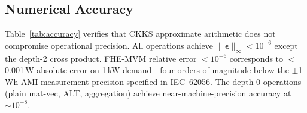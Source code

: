 \documentclass[conference]{IEEEtran}
\begin{document}
\begin{table}[!t]
\centering
\caption{Runtime Performance ($N{=}16384$, $\Delta{=}2^{40}$)}
\label{tab:performance}
\footnotesize
{}
\end{table}

\subsection{Numerical Accuracy}

Table~\ref{tab:accuracy} verifies that CKKS approximate arithmetic does not compromise operational precision. All operations achieve $\|\boldsymbol{\epsilon}\|_\infty < 10^{-6}$ except the depth-2 cross product. FHE-MVM relative error $<10^{-6}$ corresponds to $<$0.001\,W absolute error on 1\,kW demand---four orders of magnitude below the $\pm$1\,Wh AMI measurement precision specified in IEC~62056. The depth-0 operations (plain mat-vec, ALT, aggregation) achieve near-machine-precision accuracy at $\sim 10^{-8}$.
\end{document}
